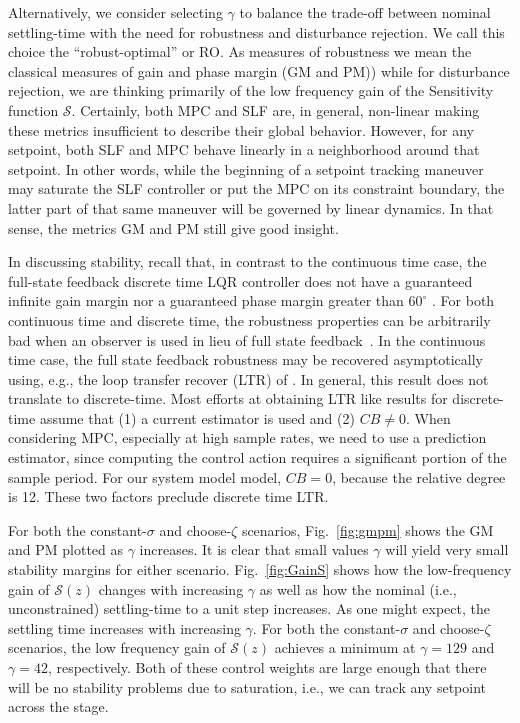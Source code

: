 \documentclass[twocolumn,twoside]{IEEEtran}
\begin{document}
Alternatively, we consider selecting $\gamma$ to balance the trade-off between nominal settling-time with the need for robustness and disturbance rejection. We call this choice the ``robust-optimal'' or RO. As measures of robustness we mean the classical measures of gain and phase margin (GM and PM)) while for disturbance rejection, we are thinking primarily of the low frequency gain of the Sensitivity function $\mathcal{S}$. Certainly, both MPC and SLF are, in general, non-linear making these metrics insufficient to describe their global behavior. However, for any setpoint, both SLF and MPC behave linearly in a neighborhood around that setpoint. In other words, while the beginning of a setpoint tracking maneuver may saturate the SLF controller or put the MPC on its constraint boundary, the latter part of that same maneuver will be governed by linear dynamics. In that sense, the metrics GM and PM still give good insight. %

In discussing stability, recall that, in contrast to the continuous time case, the full-state feedback discrete time LQR controller does not have a guaranteed infinite gain margin nor a guaranteed phase margin greater than $60^{\circ}$ \cite{andersson_moore}. For both continuous time and discrete time, the robustness properties can be arbitrarily bad when an observer is used in lieu of full state feedback~\cite{doyle_guaranteed_1978}. In the continuous time case, the full state feedback robustness may be recovered asymptotically using, e.g., the loop transfer recover (LTR) of \cite{doyle_robustness_1979}. In general, this result does not translate to discrete-time. Most efforts at obtaining LTR like results for discrete-time assume that (1) a current estimator is used and (2) $CB\neq 0$. When considering MPC, especially at high sample rates, we need to use a prediction estimator, since computing the control action requires a significant portion of the sample period. For our system model model, $CB=0$, because the relative degree is 12. These two factors preclude discrete time LTR. 


For both the constant-$\sigma$ and choose-$\zeta$ scenarios, Fig.~\ref{fig:gmpm} shows the GM and PM plotted as $\gamma$ increases. It is clear that small values $\gamma$ will yield very small stability margins for either scenario. Fig.~\ref{fig:GainS} shows how the low-frequency gain of $\mathcal{S}(z)$ changes with increasing $\gamma$ as well as how the nominal (i.e., unconstrained) settling-time to a unit step increases. As one might expect, the settling time increases with increasing $\gamma$. For both the constant-$\sigma$ and choose-$\zeta$ scenarios, the low frequency gain of $\mathcal{S}(z)$ achieves a minimum at ${\gamma=129}$ and $\gamma=42$, respectively. Both of these control weights are large enough that there will be no stability problems due to saturation, i.e., we can track any setpoint across the stage.
\end{document}
